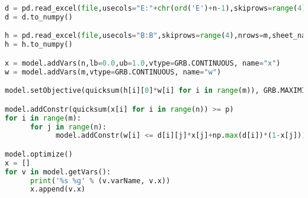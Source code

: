 \documentclass[12pt]{article}
\begin{document}
\begin{enumerate}
\begin{enumerate}
\begin{lstlisting}[language=Python]
d = pd.read_excel(file,usecols="E:"+chr(ord('E')+n-1),skiprows=range(4),nrows=m,sheet_name=sheet)
d = d.to_numpy()

h = pd.read_excel(file,usecols="B:B",skiprows=range(4),nrows=m,sheet_name=sheet)
h = h.to_numpy()

x = model.addVars(n,lb=0.0,ub=1.0,vtype=GRB.CONTINUOUS, name="x")
w = model.addVars(m,vtype=GRB.CONTINUOUS, name="w")

model.setObjective(quicksum(h[i][0]*w[i] for i in range(m)), GRB.MAXIMIZE)

model.addConstr(quicksum(x[i] for i in range(n)) >= p)
for i in range(m):
      for j in range(n):
            model.addConstr(w[i] <= d[i][j]*x[j]+np.max(d[i])*(1-x[j]))

model.optimize()
x = []
for v in model.getVars():
      print('%s %g' % (v.varName, v.x))
      x.append(v.x)


\end{lstlisting}
\end{enumerate}
\end{enumerate}
\end{document}
